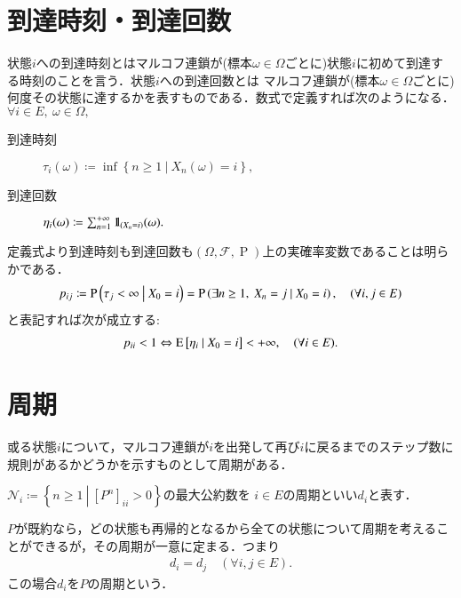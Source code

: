 \section{到達時刻・到達回数}
	\begin{dfn}[到達時刻と到達回数]
		状態$i$への到達時刻とはマルコフ連鎖が(標本$\omega \in \Omega$ごとに)状態$i$に初めて到達する時刻のことを言う．状態$i$への到達回数とは
		マルコフ連鎖が(標本$\omega \in \Omega$ごとに)何度その状態に達するかを表すものである．数式で定義すれば次のようになる．
		$\forall i \in E,\ \omega \in \Omega,$
		\begin{description}
			\item[到達時刻] $\tau_i(\omega) \coloneqq \inf{}{\left\{ n \geq 1\ \left|\ X_n(\omega) = i \right.\right\}},$
			\item[到達回数] $\eta_i(\omega) \coloneqq \sum_{n=1}^{+\infty} \mbox{1}\hspace{-0.25em}\mbox{l}_{(X_n = i)}(\omega).$
		\end{description}
	\end{dfn}
	定義式より到達時刻も到達回数も$(\Omega,\mathcal{F},\operatorname{P})$上の実確率変数であることは明らかである．
	\begin{align}
		p_{ij} \coloneqq \operatorname{P} \left( \tau_j < \infty \ \middle|\ X_0 = i \right) = \operatorname{P} \left( \exists n \geq 1,\ X_n = j \ \middle|\ X_0 = i \right), \quad (\forall i,j \in E)
	\end{align}
	と表記すれば次が成立する:
	\begin{align}
		p_{ii} < 1 \Leftrightarrow \operatorname{E} \left[ \eta_i \ \middle|\ X_0 = i \right] < +\infty, \quad (\forall i \in E).
	\end{align}

\section{周期}
	或る状態$i$について，マルコフ連鎖が$i$を出発して再び$i$に戻るまでのステップ数に規則があるかどうかを示すものとして周期がある．
	\begin{dfn}[状態の周期]
		$\mathcal{N}_i \coloneqq \left\{n \geq 1\ \left|\ [P^n]_{ii} > 0 \right.\right\}$の最大公約数を
		$i \in E$の周期といい$d_i$と表す．
	\end{dfn}
	
	\begin{prp}[既約なら周期は状態に依らない]
		$P$が既約なら，どの状態も再帰的となるから全ての状態について周期を考えることができるが，その周期が一意に定まる．つまり
		\begin{align}
			d_i = d_j \quad (\forall i,j \in E).
		\end{align}
		この場合$d_i$を$P$の周期という．
	\end{prp}
	
